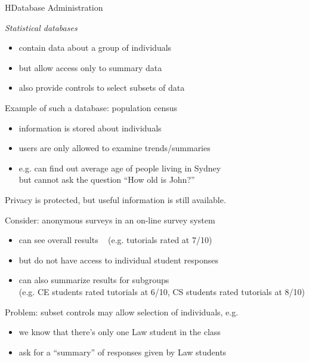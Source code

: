 \begin{lecture}{H}{Database Administration}
\begin{slide}
{\em{Statistical databases}}
\begin{itemize}
\item contain data about a group of individuals
\item but allow access only to summary data
\item also provide controls to select subsets of data
\end{itemize}
Example of such a database: population census
\begin{itemize}
\vspace{-1ex}\item information is stored about individuals
\vspace{-1ex}\item users are only allowed to examine trends/summaries
\vspace{-1ex}\item e.g. can find out average age of people living in Sydney \\
but cannot ask the question ``How old is John?''
\end{itemize}
Privacy is protected, but useful information is still available.
\end{slide}

\begin{slide}
Consider: anonymous surveys in an on-line survey system
\begin{itemize}
\item can see overall results ~ {\small (e.g. tutorials rated at 7/10)}
\item but do not have access to individual student responses
\item can also summarize results for subgroups \\
	{\small (e.g. CE students rated tutorials at 6/10, CS students rated tutorials at 8/10)}
\end{itemize}
Problem: subset controls may allow selection of individuals, e.g.
\begin{itemize}
\item we know that there's only one Law student in the class
\item ask for a ``summary'' of responses given by Law students
\end{itemize}
\end{slide}


\end{lecture}
